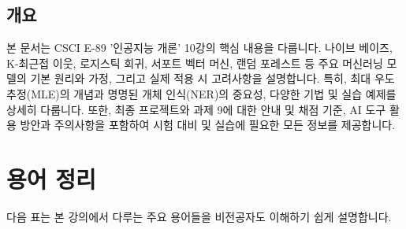 \documentclass[11pt,a4paper]{article}
\begin{document}
\begin{summarybox}
\section*{개요}
본 문서는 CSCI E-89 '인공지능 개론' 10강의 핵심 내용을 다룹니다.
나이브 베이즈, K-최근접 이웃, 로지스틱 회귀, 서포트 벡터 머신, 랜덤 포레스트 등 주요 머신러닝 모델의 기본 원리와 가정, 그리고 실제 적용 시 고려사항을 설명합니다.
특히, 최대 우도 추정(MLE)의 개념과 명명된 개체 인식(NER)의 중요성, 다양한 기법 및 실습 예제를 상세히 다룹니다.
또한, 최종 프로젝트와 과제 9에 대한 안내 및 채점 기준, AI 도구 활용 방안과 주의사항을 포함하여 시험 대비 및 실습에 필요한 모든 정보를 제공합니다.
\end{summarybox}

\newpage
\section*{용어 정리}
다음 표는 본 강의에서 다루는 주요 용어들을 비전공자도 이해하기 쉽게 설명합니다.
\end{document}

